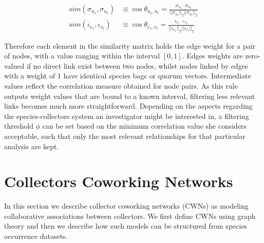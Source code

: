 {\begin{equation}
\label{equation:cosine_similarity}
\begin{split}
sim(\sigma_{u_s},\sigma_{u_t}) &\equiv
\cos \theta_{u_s,u_t} =
\frac{  \sigma_{u_s} \cdot \sigma_{u_t}  }{  ||\sigma_{u_s}||_2  ||\sigma_{u_t}||_2  } \\
sim(\iota_{v_s},\iota_{v_t}) &\equiv
\cos \theta_{v_s,v_t} =
\frac{  \iota_{v_s} \cdot \iota_{v_t}  }{  ||\iota_{v_s}||_2  ||\iota_{v_t}||_2  } 
\end{split}
\end{equation}

Therefore each element in the similarity matrix holds the edge weight for a pair of nodes, with a value ranging within the interval $[0,1]$. Edges weights are zero-valued if no direct link exist between two nodes,  whilst nodes linked by edges with a weight of $1$ have identical species bags or quorum vectors. Intermediate values reflect the correlation measure obtained for node pairs.
As this rule outputs weight values that are bound to a known interval, filtering less relevant links becomes much more straightforward. Depending on the aspects regarding the species-collectors system an investigator might be interested in, a filtering threshold $\phi$ can be set based on the minimum correlation value she considers acceptable, such that only the most relevant relationships for that particular analysis are kept.












%

\section{Collectors Coworking Networks}
In this section we describe collector coworking networks (CWNs) as modeling collaborative associations between collectors.
We first define CWNs using graph theory and then we describe how such models can be structured from species occurrence datasets.

}
